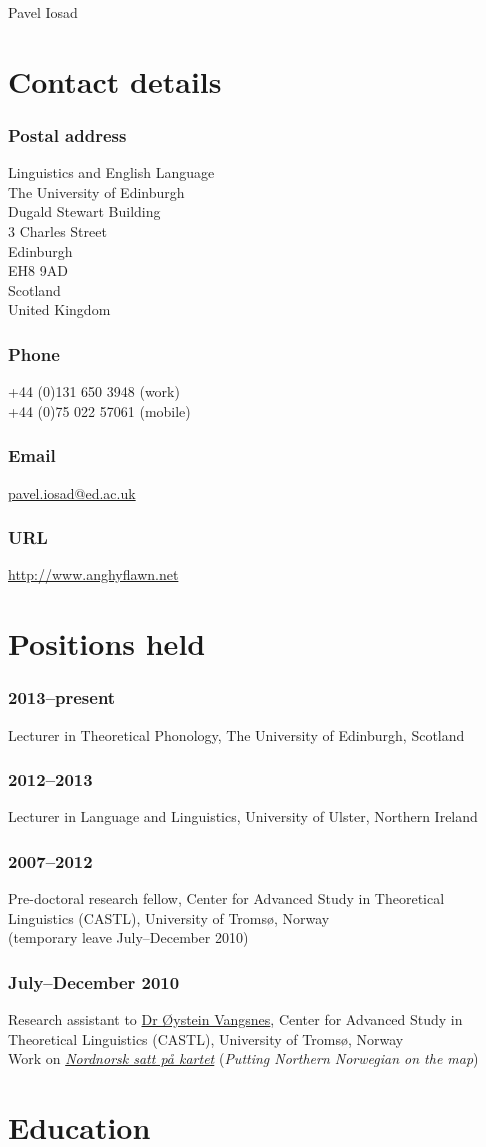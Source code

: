 \documentclass[a4paper,11pt]{article}
\newlength\blockwidth
\newcommand\cvitem[1]{\hspace*{\blockwidth}\begin{minipage}[t]{\linewidth-\blockwidth}
#1
\end{minipage}\par}
\newcommand{\block}[2]{\subsubsection{#1}\cvitem{#2}}
\begin{document}
\thispagestyle{plain}
{\Huge{} Pavel Iosad}\\[\baselineskip]

\section{Contact details}

\raggedcolumns

\begin{multicols}{2}
\block{Postal address}{Linguistics and English Language\\
The University of Edinburgh\\
Dugald Stewart Building\\
3 Charles Street\\
Edinburgh\\
EH8 9AD\\
Scotland\\
United Kingdom}
\block{Phone}{+44 (0)131 650 3948 (work)\\
+44 (0)75 022 57061 (mobile)}
\block{Email}{\href{mailto:pavel.iosad@ed.ac.uk}{pavel.iosad@ed.ac.uk}}
\block{URL}{\href{http://www.anghyflawn.net}{http://www.anghyflawn.net}}
\end{multicols}

\section{Positions held}
\block{2013--present}{Lecturer in Theoretical Phonology, The University of Edinburgh, Scotland}
\block{2012--2013}{Lecturer in Language and Linguistics, University of Ulster, Northern Ireland}
\block{2007--2012}{Pre-doctoral research fellow, Center for Advanced Study in Theoretical Linguistics (CASTL), University of Tromsø, Norway\\
(temporary leave July--December 2010)}
\block{July--December 2010}{Research assistant to \href{http://www.hum.uit.no/a/vangsnes}{Dr Øystein Vangsnes}, Center for Advanced Study in Theoretical Linguistics (CASTL), University of Tromsø, Norway\\
Work on \href{http://nordnorsk.uit.no/}{\textit{Nordnorsk satt på kartet}} (\textit{Putting Northern Norwegian on the map})}

\section{Education}
\end{document}
